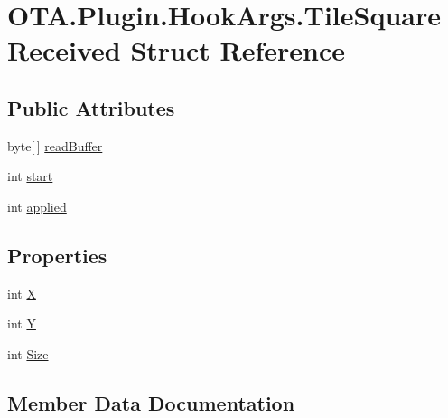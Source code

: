 \hypertarget{struct_o_t_a_1_1_plugin_1_1_hook_args_1_1_tile_square_received}{}\section{O\+T\+A.\+Plugin.\+Hook\+Args.\+Tile\+Square\+Received Struct Reference}
\label{struct_o_t_a_1_1_plugin_1_1_hook_args_1_1_tile_square_received}
\subsection*{Public Attributes}
\begin{DoxyCompactItemize}
\item 
byte\mbox{[}$\,$\mbox{]} \hyperlink{struct_o_t_a_1_1_plugin_1_1_hook_args_1_1_tile_square_received_a682e95f93f42374fd8aa7fc4fa6fc557}{read\+Buffer}
\item 
int \hyperlink{struct_o_t_a_1_1_plugin_1_1_hook_args_1_1_tile_square_received_af8a9881ccffbe96fceff28090a6a75f0}{start}
\item 
int \hyperlink{struct_o_t_a_1_1_plugin_1_1_hook_args_1_1_tile_square_received_a58890bce86f1e805f9e92def17a5acc2}{applied}
\end{DoxyCompactItemize}
\subsection*{Properties}
\begin{DoxyCompactItemize}
\item 
int \hyperlink{struct_o_t_a_1_1_plugin_1_1_hook_args_1_1_tile_square_received_a3afc2e68719a6dbd127665f32de217d2}{X}
\item 
int \hyperlink{struct_o_t_a_1_1_plugin_1_1_hook_args_1_1_tile_square_received_a5d3b0759ee398e7d2acb469ece8afb1e}{Y}
\item 
int \hyperlink{struct_o_t_a_1_1_plugin_1_1_hook_args_1_1_tile_square_received_afc4e00f95f2c248e1199a59910aefd1c}{Size}
\end{DoxyCompactItemize}


\subsection{Member Data Documentation}
\hypertarget{struct_o_t_a_1_1_plugin_1_1_hook_args_1_1_tile_square_received_a58890bce86f1e805f9e92def17a5acc2}{}
